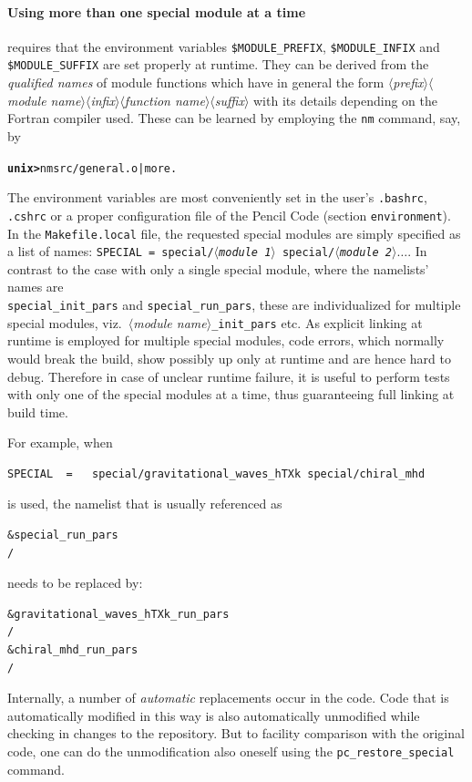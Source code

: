 \documentclass[\mydriver,12pt,twoside,notitlepage,a4paper]{article}
\newcommand{\prompt}[1]{{\ttfamily\bfseries{}#1}}
\begin{document}
\paragraph
{Using more than one special module at a time} requires that the environment
variables {\tt \$MODULE_PREFIX}, {\tt \$MODULE_INFIX} and {\tt \$MODULE_SUFFIX}
are set properly at runtime. They can be derived from the {\it qualified names}
of module functions which have in general the form 
 $\langle${\it prefix}$\rangle\langle${\it module name}$\rangle\langle${\it infix}$\rangle\langle${\it function name}$\rangle\langle${\it suffix}$\rangle$
with its details depending on the Fortran compiler used. These can be learned by employing the {\tt nm} command, say, by 
\begin{alltt}
 \prompt{unix> }  nm src/general.o | more .
\end{alltt}
The environment variables are most conveniently set in the user's {\tt .bashrc}, {\tt .cshrc} or a proper configuration file of the {\sc Pencil Code} (section {\tt environment}).
In the {\tt Makefile.local} file, the requested special modules are simply specified as a list of names:
{\tt SPECIAL = special/$\langle${\it module 1}$\rangle$ special/$\langle${\it module 2}$\rangle\ldots$}.
In contrast to the case with only a single special module, where the namelists' names are \\
{\tt special_init_pars} and {\tt special_run_pars},
these are individualized for multiple special modules, viz.\ $\langle${\it module name}$\rangle${\tt _init_pars} etc.
As explicit linking at runtime is employed for multiple special modules, code errors, which normally would break the build, show possibly up only at runtime
and are hence hard to debug. Therefore in case of unclear runtime failure, it is useful to perform tests with only one of the special modules at a time, thus
guaranteeing full linking at build time.

For example, when
\begin{verbatim}
SPECIAL  =   special/gravitational_waves_hTXk special/chiral_mhd
\end{verbatim}
is used, the namelist that is usually referenced as
\begin{verbatim}
&special_run_pars
/
\end{verbatim}
needs to be replaced by:
\begin{verbatim}
&gravitational_waves_hTXk_run_pars
/
&chiral_mhd_run_pars
/
\end{verbatim}
Internally, a number of \textit{automatic} replacements occur in the code.
Code that is automatically modified in this way is also automatically
unmodified while checking in changes to the repository.
But to facility comparison with the original code, one can do the unmodification
also oneself using the {\tt pc\_restore\_special} command.
\end{document}
